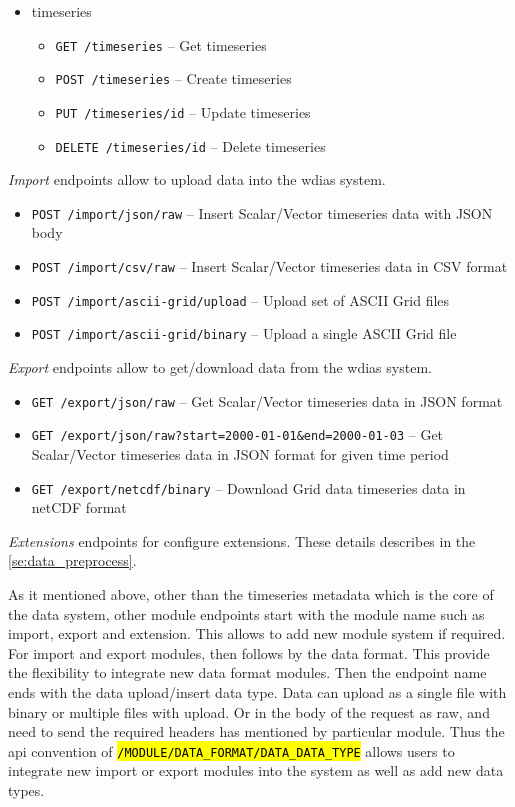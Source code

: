 \begin{itemize}
\begin{itemize}
    \end{itemize}
    \item timeseries
    \begin{itemize}
        \item \texttt{GET /timeseries} -- Get timeseries
        \item \texttt{POST /timeseries} -- Create timeseries
        \item \texttt{PUT /timeseries/id} -- Update timeseries
        \item \texttt{DELETE /timeseries/id} -- Delete timeseries
    \end{itemize}
\end{itemize}

\emph{Import} endpoints allow to upload data into the \acrshort{wdias} system.
\begin{itemize}
    \item \texttt{POST /import/json/raw} -- Insert Scalar/Vector timeseries data with JSON body
    \item \texttt{POST /import/csv/raw} -- Insert Scalar/Vector timeseries data in CSV format
    \item \texttt{POST /import/ascii-grid/upload} -- Upload set of ASCII Grid files
    \item \texttt{POST /import/ascii-grid/binary} -- Upload a single ASCII Grid file
\end{itemize}

\emph{Export} endpoints allow to get/download data from the \acrshort{wdias} system.
\begin{itemize}
    \item \texttt{GET /export/json/raw} -- Get Scalar/Vector timeseries data in JSON format
    \item \texttt{GET /export/json/raw?start=2000-01-01\&end=2000-01-03} -- Get Scalar/Vector timeseries data in JSON format for given time period
    \item \texttt{GET /export/netcdf/binary} -- Download Grid data timeseries data in \acrshort{netCDF} format
\end{itemize}

\emph{Extensions} endpoints for configure extensions. These details describes in the \cref{se:data_preprocess}.

As it mentioned above, other than the timeseries metadata which is the core of the data system, other module endpoints start with the module name such as import, export and extension. This allows to add new module system if required.
For import and export modules, then follows by the data format. This provide the flexibility to integrate new data format modules.
Then the endpoint name ends with the data upload/insert data type. Data can upload as a single file with binary or multiple files with upload. Or in the body of the request as raw, and need to send the required headers has mentioned by particular module.
Thus the \acrshort{api} convention of \texttt{\hl{/MODULE/DATA\_FORMAT/DATA\_DATA\_TYPE}} allows users to integrate new import or export modules into the system as well as add new data types.
